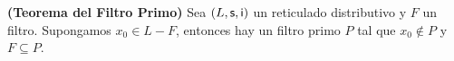   \begin{theorem} \label{theorem_24}
    \PN \textbf{(Teorema del Filtro Primo)} Sea $(L, \mathsf{s}, \mathsf{i})$ un reticulado distributivo y $F$ un filtro. Supongamos
    $x_{0} \in L-F$, entonces hay un filtro primo $P$ tal que $x_{0} \notin P$ y $F \subseteq P$.
  \end{theorem}
